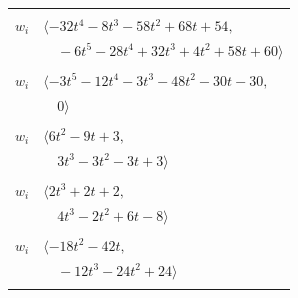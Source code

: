\documentclass[11pt]{article}
\begin{document}
\begin{longtable}{@{}ll@{}}
\addlinespace[2pt]
\multicolumn{2}{@{}p{0.97\textwidth}@{}}{$i=35$, $D_i=1$, $\rho_{ij}$: $4{:}1, \allowbreak 5{:}1, \allowbreak 10{:}2, \allowbreak 11{:}2, \allowbreak 13{:}1, \allowbreak 16{:}1, \allowbreak 21{:}1, \allowbreak 24{:}1, \allowbreak 32{:}2, \allowbreak 33{:}1, \allowbreak 39{:}2, \allowbreak 41{:}2, \allowbreak 42{:}2$}\\
$w_i$ & $\langle -32t^{4}-8t^{3}-58t^{2}+68t+54,$\\
 & $\quad -6t^{5}-28t^{4}+32t^{3}+4t^{2}+58t+60\rangle$\\
\addlinespace[2pt]
\multicolumn{2}{@{}p{0.97\textwidth}@{}}{$i=36$, $D_i=1$, $\rho_{ij}$: $3{:}2, \allowbreak 13{:}1, \allowbreak 17{:}1, \allowbreak 20{:}1, \allowbreak 24{:}2, \allowbreak 29{:}2, \allowbreak 30{:}2, \allowbreak 37{:}1$}\\
$w_i$ & $\langle -3t^{5}-12t^{4}-3t^{3}-48t^{2}-30t-30,$\\
 & $\quad 0\rangle$\\
\addlinespace[2pt]
\multicolumn{2}{@{}p{0.97\textwidth}@{}}{$i=37$, $D_i=1$, $\rho_{ij}$: $6{:}1, \allowbreak 7{:}2, \allowbreak 15{:}2, \allowbreak 18{:}2, \allowbreak 23{:}1, \allowbreak 30{:}1, \allowbreak 36{:}2$}\\
$w_i$ & $\langle 6t^{2}-9t+3,$\\
 & $\quad 3t^{3}-3t^{2}-3t+3\rangle$\\
\addlinespace[2pt]
\multicolumn{2}{@{}p{0.97\textwidth}@{}}{$i=38$, $D_i=1$, $\rho_{ij}$: $7{:}2, \allowbreak 12{:}2, \allowbreak 16{:}2, \allowbreak 21{:}2, \allowbreak 25{:}2, \allowbreak 29{:}1, \allowbreak 33{:}1, \allowbreak 40{:}1$}\\
$w_i$ & $\langle 2t^{3}+2t+2,$\\
 & $\quad 4t^{3}-2t^{2}+6t-8\rangle$\\
\addlinespace[2pt]
\multicolumn{2}{@{}p{0.97\textwidth}@{}}{$i=39$, $D_i=1$, $\rho_{ij}$: $3{:}1, \allowbreak 8{:}2, \allowbreak 10{:}1, \allowbreak 13{:}2, \allowbreak 15{:}1, \allowbreak 24{:}1, \allowbreak 35{:}1, \allowbreak 46{:}1$}\\
$w_i$ & $\langle -18t^{2}-42t,$\\
 & $\quad -12t^{3}-24t^{2}+24\rangle$\\
\addlinespace[2pt]
\multicolumn{2}{@{}p{0.97\textwidth}@{}}{$i=40$, $D_i=1$, $\rho_{ij}$: $0{:}1, \allowbreak 2{:}2, \allowbreak 3{:}2, \allowbreak 8{:}2, \allowbreak 10{:}1, \allowbreak 23{:}1, \allowbreak 31{:}1, \allowbreak 33{:}2, \allowbreak 38{:}2, \allowbreak 45{:}2$}\\

\end{longtable}
\end{document}

